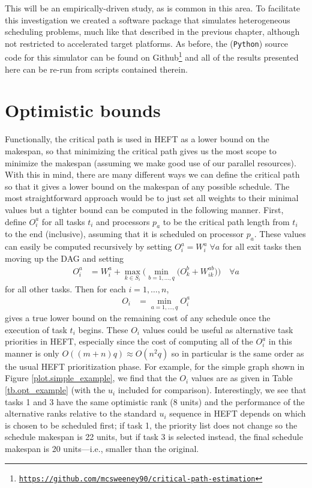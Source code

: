 \documentclass[12pt]{article}
\begin{document}
This will be an empirically-driven study, as is common in this area. To facilitate this investigation we created a software package that simulates heterogeneous scheduling problems, much like that described in the previous chapter, although not restricted to accelerated target platforms. As before, the ({\tt Python}) source code for this simulator can be found on Github\footnote{\href{https://github.com/mcsweeney90/critical-path-estimation}{{\tt \small https://github.com/mcsweeney90/critical-path-estimation}}} and all of the results presented here can be re-run from scripts contained therein. 


\section{Optimistic bounds}
\label{sect.optimistic}

Functionally, the critical path is used in HEFT as a lower bound on the makespan, so that minimizing the critical path gives us the most scope to minimize the makespan (assuming we make good use of our parallel resources). With this in mind, there are many different ways we can define the critical path so that it gives a lower bound on the makespan of any possible schedule. The most straightforward approach would be to just set all weights to their minimal values but a tighter bound can be computed in the following manner. First, define $O_i^a$ for all tasks $t_i$ and processors $p_a$ to be the critical path length from $t_i$ to the end (inclusive), assuming that it is scheduled on processor $p_a$. These values can easily be computed recursively by setting $O_i^a = W_i^a \; \forall a$ for all exit tasks then moving up the DAG and setting 
\begin{align}
O_i^a &= W_i^a + \max_{k \in S_i} \bigg( \min_{b = 1, \dots, q} \big( O_k^b + W_{ik}^{ab} \big)  \bigg) \quad \forall a \label{eq.opt_uia} 
\end{align}
for all other tasks. Then for each $i = 1, \dots, n$,
\begin{align}
O_i &= \min_{a = 1, \dots, q}O_i^a \label{eq.opt_ui} 
\end{align}
gives a true lower bound on the remaining cost of any schedule once the execution of task $t_i$ begins. These $O_i$ values could be useful as alternative task priorities in HEFT, especially since the cost of computing all of the $O_i^a$ in this manner is only $O((m + n)q) \approx O(n^2q)$ so in particular is the same order as the usual HEFT prioritization phase. For example, for the simple graph shown in Figure \ref{plot.simple_example}, we find that the $O_i$ values are as given in Table \ref{tb.opt_example} (with the $u_i$ included for comparison). Interestingly, we see that tasks 1 and 3 have the same optimistic rank (8 units) and the performance of the alternative ranks relative to the standard $u_i$ sequence in HEFT depends on which is chosen to be scheduled first; if task 1, the priority list does not change so the schedule makespan is 22 units, but if task 3 is selected instead, the final schedule makespan is 20 units---i.e., smaller than the original.
\end{document}
